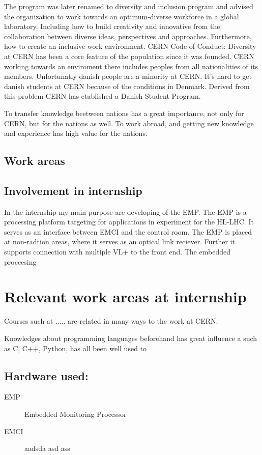 \noindent The program was later renamed to diversity and inclusion program and advised the organization to work towards an optimum-diverse workforce in a global laboratory.
Including how to build creativity and innovative from the collaboration between diverse ideas, perspectives and approaches. Furthermore, how to create an inclusive work environment.
\newline\newline
CERN Code of Conduct: Diversity at CERN has been a core feature of the population since it was founded. CERN working towards an enviroment there includes peoples from all nationalities of its members. Unfortunatly danish people are a minority at CERN. It's hard to get danish students at CERN because of the conditions in Denmark. Derived from this problem CERN has etablished a Danish Student Program. 

To transfer knowledge beetween nations has a great importance, not only for CERN, but for the nations as well. To work abroad, and getting new knowledge and experience has high value for the nations. 


\section{Work areas}



\section{Involvement in internship}
In the internship my main purpose are developing of the EMP. The EMP is a processing platform targeting for applications in experiment for the HL-LHC. It serves as an interface between EMCI and the control room. The EMP is placed at non-radtion areas, where it serves as an optical link reciever. Further it supports connection with multiple VL+ to the front end. The embedded proccesing 

\chapter{Relevant work areas at internship}

Courses such at ..... are related in many ways to the work at CERN.

Knowledges about programming languages beforehand has great influence a
such as C, C++, Python, has all been well used to

\section*{Hardware used:}
\begin{description}
    \item[EMP]  Embedded Monitoring Processor
    \item[EMCI] aadsda asd ass
\end{description}

